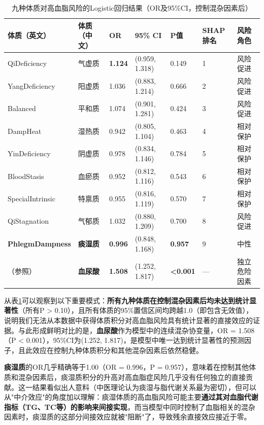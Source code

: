 \documentclass[12pt,a4paper]{ctexart}
\begin{document}
\begin{table}[H]
\centering
\caption{九种体质对高血脂风险的Logistic回归结果（OR及95\%CI，控制混杂因素后）}
\label{tab:constitution_or}
\begin{tabular}{lllllll}
\toprule
体质（英文） & 体质（中文） & OR & 95\% CI & P值 & SHAP排名 & 风险角色 \\
\midrule
QiDeficiency     & 气虚质 & \textbf{1.124} & (0.959, 1.318) & 0.149 & 1 & 风险促进 \\
YangDeficiency   & 阳虚质 & 1.036          & (0.883, 1.214) & 0.666 & 2 & 风险促进 \\
Balanced         & 平和质 & 1.074          & (0.901, 1.281) & 0.424 & 3 & 风险促进 \\
DampHeat         & 湿热质 & 0.942          & (0.805, 1.104) & 0.463 & 4 & 相对保护 \\
YinDeficiency    & 阴虚质 & 0.978          & (0.834, 1.146) & 0.784 & 5 & 相对保护 \\
BloodStasis      & 血瘀质 & 0.952          & (0.812, 1.116) & 0.543 & 6 & 相对保护 \\
SpecialIntrinsic & 特禀质 & 0.955          & (0.816, 1.119) & 0.570 & 7 & 相对保护 \\
QiStagnation     & 气郁质 & 1.032          & (0.880, 1.209) & 0.700 & 8 & 风险促进 \\
\textbf{PhlegmDampness} & \textbf{痰湿质} & \textbf{0.996} & (0.848, 1.168) & \textbf{0.957} & 9 & 中性 \\
\midrule
（参照）& \textbf{血尿酸} & \textbf{1.508} & (1.252, 1.817) & \textbf{<0.001} & — & 独立危险因素 \\
\bottomrule
\end{tabular}
\end{table}

从表\ref{tab:constitution_or}可以观察到以下重要模式：\textbf{所有九种体质在控制混杂因素后均未达到统计显著性}（所有P > 0.10），且所有体质的95\%置信区间均跨越1.0（即包含无效值），说明我们无法从本数据中获得体质积分对高血脂风险具有统计显著的直接效应的证据。与此形成鲜明对比的是，\textbf{血尿酸}作为模型中的连续混杂协变量，OR = 1.508（P < 0.001），95\%CI为(1.252, 1.817)，是模型中唯一达到统计显著性的预测因子，且此效应在控制九种体质积分和其他混杂因素后依然稳健。

\textbf{痰湿质}的OR几乎精确等于1.00（OR = 0.996，P = 0.957），意味着在控制其他体质和混杂因素后，痰湿质积分的升高对高血脂症风险几乎没有任何独立的直接贡献。这一结果看似出人意料（中医理论认为痰湿与脂代谢关系最为密切），但可以从"中介效应"的角度加以理解：痰湿体质的高血脂风险可能主要\textbf{通过其对血脂代谢指标（TG、TC等）的影响来间接实现}，而当模型中同时控制了血脂相关的混杂因素时，痰湿质的这部分间接效应就被"阻断"了，导致残余直接效应接近于零。
\end{document}
